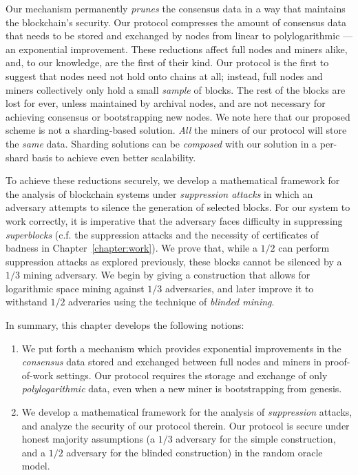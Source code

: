 Our mechanism permanently
\emph{prunes} the consensus data in a way that maintains the
blockchain's security.
Our protocol compresses the amount of consensus
data that needs to be stored and exchanged by nodes from linear to
polylogarithmic --- an exponential improvement. These reductions affect
full nodes and miners alike, and, to our knowledge, are the first of their
kind. Our protocol is the first to suggest that nodes need not
hold onto chains at all; instead, full nodes and miners collectively only
hold a small \emph{sample} of blocks. The rest of the blocks are lost
for ever, unless maintained by archival nodes, and are not necessary
for achieving consensus or bootstrapping new nodes. We note here that
our proposed scheme is not a sharding-based solution. \emph{All} the miners
of our protocol will store the \emph{same} data. Sharding solutions can be
\emph{composed} with our solution in a per-shard basis to achieve even
better scalability.

To achieve these reductions securely, we develop a mathematical framework
for the analysis of blockchain systems under \emph{suppression attacks} in
which an adversary attempts to silence the generation of selected
blocks. For our system to work correctly, it is imperative that
the adversary faces difficulty in suppressing \emph{superblocks}
(c.f. the suppression attacks and the necessity of certificates of
badness in Chapter~\ref{chapter:work}).
We prove that, while a $1/2$ can perform suppression attacks as
explored previously, these blocks cannot be silenced
by a $1/3$ mining adversary. We begin by giving a construction
that allows for logarithmic space mining against $1/3$ adversaries,
and later improve it to withstand $1/2$ adveraries using the technique
of \emph{blinded mining}.

In summary, this chapter develops the following notions:

\begin{enumerate}
  \item We put forth a mechanism which provides exponential improvements
        in the \emph{consensus} data stored and exchanged between full nodes
        and miners in proof-of-work settings. Our protocol requires the
        storage and exchange of only \emph{polylogarithmic} data, even
        when a new miner is bootstrapping from genesis.
  \item We develop a mathematical framework for the analysis of
        \emph{suppression} attacks, and analyze the security of our protocol
        therein. Our protocol is secure under honest majority assumptions
        (a $1/3$ adversary for the simple construction, and a $1/2$ adversary
         for the blinded construction) in the random oracle model.
\end{enumerate}

